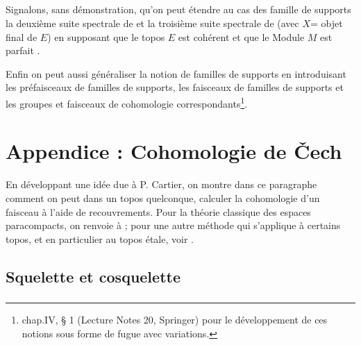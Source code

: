 \documentclass[10pt]{../fichiers-configuration-latex/smfart}
\begin{document}
\setcounter{subsection}{15}
\subsection{}
Signalons, sans démonstration, qu'on peut étendre au cas des
famille de supports la deuxième suite spectrale de  et la
troisième suite spectrale de  (avec $X $= objet final de $E$)
en supposant que le topos $E$ est cohérent et que le Module $M$ est
parfait \cite{SGA4-05:13}.

Enfin on peut aussi généraliser la notion de familles de supports
en introduisant les préfaisceaux de familles de supports, les
faisceaux de familles de supports et les groupes \pageoriginale et
faisceaux de cohomologie correspondants\footnote{\cf \cite{SGA4-05:12} chap.IV, \S
  1 (Lecture Notes 20, Springer) pour le développement de ces
  notions sous forme de fugue avec variations.}.

\section{Appendice : Cohomologie de Čech}

En développant une idée due à P. Cartier, on montre dans ce
paragraphe comment on peut dans un topos quelconque, calculer la
cohomologie d'un faisceau à l'aide de recouvrements. Pour la théorie
classique des espaces paracompacts, on renvoie à \cite{SGA4-05:7}; pour une
autre méthode qui s'applique à certains topos, et en particulier au
topos étale, voir \cite{SGA4-05:14}.

\subsection{Squelette et cosquelette}

\setcounter{subsubsection}{-1}
\subsubsection{}
\end{document}
